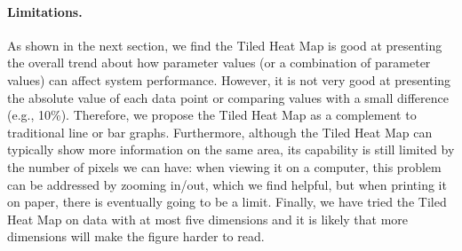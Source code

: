 \vspace{-.1in}
\paragraph{Limitations.}
As shown in the next section, we find the Tiled Heat Map is good at presenting the overall
trend about how parameter values (or a combination of parameter values) can affect
system performance. However, it is not very good at presenting the absolute value of
each data point or comparing values with a small difference (e.g., 10\%). Therefore,
we propose the Tiled Heat Map as a complement to traditional line or bar graphs.
Furthermore, although the Tiled Heat Map can typically show more information on
the same area, its capability is still limited by the number of pixels we can have:
when viewing it on a computer, this problem can be addressed by zooming in/out, which we find helpful, but
when printing it on paper, there is eventually going to be a limit.
Finally, we have tried the Tiled Heat Map on data with at most five dimensions
and it is likely that more dimensions will make the figure harder to read.



